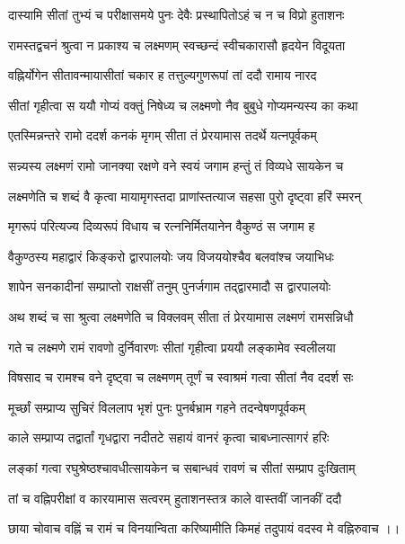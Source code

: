 \twolineshloka
{दास्यामि सीतां तुभ्यं च परीक्षासमये पुनः}
{देवैः प्रस्थापितोऽहं च न च विप्रो हुताशनः}%

\twolineshloka
{रामस्तद्वचनं श्रुत्वा न प्रकाश्य च लक्ष्मणम्}
{स्वच्छन्दं स्वीचकारासौ हृदयेन विदूयता}%

\twolineshloka
{वह्निर्योगेन सीतावन्मायासीतां चकार ह}
{तत्तुल्यगुणरूपां तां ददौ रामाय नारद}%

\twolineshloka
{सीतां गृहीत्वा स ययौ गोप्यं वक्तुं निषेध्य च}
{लक्ष्मणो नैव बुबुधे गोप्यमन्यस्य का कथा}%

\twolineshloka
{एतस्मिन्नन्तरे रामो ददर्श कनकं मृगम्}
{सीता तं प्रेरयामास तदर्थे यत्नपूर्वकम्}%

\twolineshloka
{सन्न्यस्य लक्ष्मणं रामो जानक्या रक्षणे वने}
{स्वयं जगाम हन्तुं तं विव्यधे सायकेन च}%

\twolineshloka
{लक्ष्मणेति च शब्दं वै कृत्वा मायामृगस्तदा}
{प्राणांस्तत्याज सहसा पुरो दृष्ट्वा हरिं स्मरन्}%

\twolineshloka
{मृगरूपं परित्यज्य दिव्यरूपं विधाय च}
{रत्ननिर्मितयानेन वैकुण्ठं स जगाम ह}%

\twolineshloka
{वैकुण्ठस्य महाद्वारं किङ्करो द्वारपालयोः}
{जय विजययोश्चैव बलवांश्च जयाभिधः}%

\twolineshloka
{शापेन सनकादीनां सम्प्राप्तो राक्षसीं तनुम्}
{पुनर्जगाम तद्द्वारमादौ स द्वारपालयोः}%

\twolineshloka
{अथ शब्दं च सा श्रुत्वा लक्ष्मणेति च विक्लवम्}
{सीता तं प्रेरयामास लक्ष्मणं रामसन्निधौ}%

\twolineshloka
{गते च लक्ष्मणे रामं रावणो दुर्निवारणः}
{सीतां गृहीत्वा प्रययौ लङ्कामेव स्वलीलया}%

\twolineshloka
{विषसाद च रामश्च वने दृष्ट्वा च लक्ष्मणम्}
{तूर्णं च स्वाश्रमं गत्वा सीतां नैव ददर्श सः}%

\twolineshloka
{मूर्च्छां सम्प्राप्य सुचिरं विललाप भृशं पुनः}
{पुनर्बभ्राम गहने तदन्वेषणपूर्वकम्}%

\twolineshloka
{काले सम्प्राप्य तद्वार्तां गृधद्वारा नदीतटे}
{सहायं वानरं कृत्वा चाबध्नात्सागरं हरिः}%

\twolineshloka
{लङ्कां गत्वा रघुश्रेष्ठश्चावधीत्सायकेन च}
{सबान्धवं रावणं च सीतां सम्प्राप दुःखिताम्}%

\twolineshloka
{तां च वह्निपरीक्षां व कारयामास सत्वरम्}
{हुताशनस्तत्र काले वास्तवीं जानकीं ददौ}%

\twolineshloka
{छाया चोवाच वह्निं च रामं च विनयान्विता}
{करिष्यामीति किमहं तदुपायं वदस्व मे}%
वह्निरुवाच ।।

